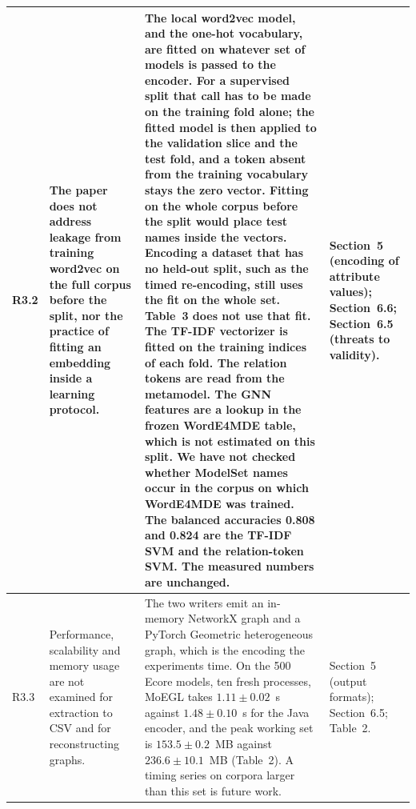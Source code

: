 \documentclass[11pt,a4paper]{article}
\begin{document}
\begin{longtable}{@{}P{1.0cm}P{4.3cm}P{5.9cm}P{3.9cm}@{}}
R3.2 &
The paper does not address leakage from training word2vec on the full corpus before the split, nor the practice of fitting an embedding inside a learning protocol. &
The local word2vec model, and the one-hot vocabulary, are fitted on whatever set of models is passed to the encoder. For a supervised split that call has to be made on the training fold alone; the fitted model is then applied to the validation slice and the test fold, and a token absent from the training vocabulary stays the zero vector. Fitting on the whole corpus before the split would place test names inside the vectors. Encoding a dataset that has no held-out split, such as the timed re-encoding, still uses the fit on the whole set.
Table~3 does not use that fit. The TF-IDF vectorizer is fitted on the training indices of each fold. The relation tokens are read from the metamodel. The GNN features are a lookup in the frozen WordE4MDE table, which is not estimated on this split. We have not checked whether ModelSet names occur in the corpus on which WordE4MDE was trained. The balanced accuracies 0.808 and 0.824 are the TF-IDF SVM and the relation-token SVM. The measured numbers are unchanged. &
Section~5 (encoding of attribute values); Section~6.6; Section~6.5 (threats to validity). \\
\midrule

R3.3 &
Performance, scalability and memory usage are not examined for extraction to CSV and for reconstructing graphs. &
The two writers emit an in-memory NetworkX graph and a PyTorch Geometric heterogeneous graph, which is the encoding the experiments time. On the 500 Ecore models, ten fresh processes, MoEGL takes $1.11\pm0.02$~s against $1.48\pm0.10$~s for the Java encoder, and the peak working set is $153.5\pm0.2$~MB against $236.6\pm10.1$~MB (Table~2). A timing series on corpora larger than this set is future work. &
Section~5 (output formats); Section~6.5; Table~2. \\
\midrule


\end{longtable}
\end{document}
